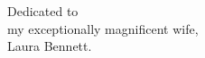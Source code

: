\documentclass[12pt]{report}
\begin{document}
\newpage
\thispagestyle{plain}
\vspace*{3in}
\begin{center}
  Dedicated to\\
  my exceptionally magnificent wife, \\
  Laura Bennett.
\end{center}

\newpage
\setcounter{page}{1}
\setlength{\parindent}{2em}


%
%

 




%
%
%
%
\renewcommand\baselinestretch{1.5}
%
%

 
 

%
%
%
%

\end{document}
